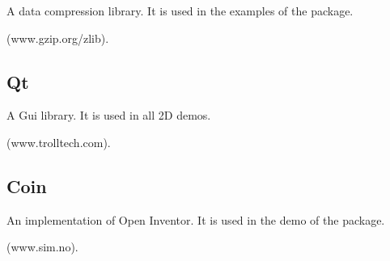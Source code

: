 A data compression library.
It is used in the examples of the  package.

 (www.gzip.org/zlib).

\subsection{Qt \label{thirdparty:qt}}

A {\sc Gui} library.   It is used in all 2D demos. 

 (www.trolltech.com).


\subsection{Coin \label{thirdparty:coin}}

An implementation of Open Inventor.  It is used in the demo
of the  package.

(www.sim.no).

